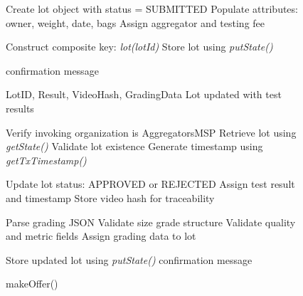 \documentclass[12pt]{article}
\begin{document}
\begin{figure}[h]
\begin{minipage}[t]{0.48\linewidth}
\begin{algorithm}[H]
\begin{algorithmic}[1]
					\State Create lot object with status = SUBMITTED
					\State Populate attributes: owner, weight, date, bags
					\State Assign aggregator and testing fee
					
					\State Construct composite key: \textit{lot(lotId)}
					\State Store lot using \textit{putState()}
					
					\State \Return confirmation message
					
				\end{algorithmic}
			\end{algorithm}
		\end{minipage}
		
	\end{figure}
	
		\begin{figure}[h]
		\centering
		\caption{Testing and Offer Mechanisms in Supply Chain}
		\label{fig:test_offer}
		
		\begin{minipage}[t]{0.48\linewidth}
			\vspace{0pt}
			\centering
			\begin{algorithm}[H]
				\caption{testCoffee()}
				\begin{algorithmic}[1]
					
					\Require LotID, Result, VideoHash, GradingData
					\Ensure Lot updated with test results
					
					\State Verify invoking organization is AggregatorsMSP
					\State Retrieve lot using \textit{getState()}
					\State Validate lot existence
					\State Generate timestamp using \textit{getTxTimestamp()}
					
					\State Update lot status: APPROVED or REJECTED
					\State Assign test result and timestamp
					\State Store video hash for traceability
					
					\State Parse grading JSON
					\State Validate size grade structure
					\State Validate quality and metric fields
					\State Assign grading data to lot
					\EndIf
					
					\State Store updated lot using \textit{putState()}
					\State \Return confirmation message
					
				\end{algorithmic}
			\end{algorithm}
		\end{minipage}
		\hfill
		\begin{minipage}[t]{0.48\linewidth}
			\vspace{0pt}
			\centering
			\begin{algorithm}[H]
				\caption{makeOffer()}
				\begin{algorithmic}[1]
					

\end{algorithmic}
\end{algorithm}
\end{minipage}
\end{figure}
\end{document}
